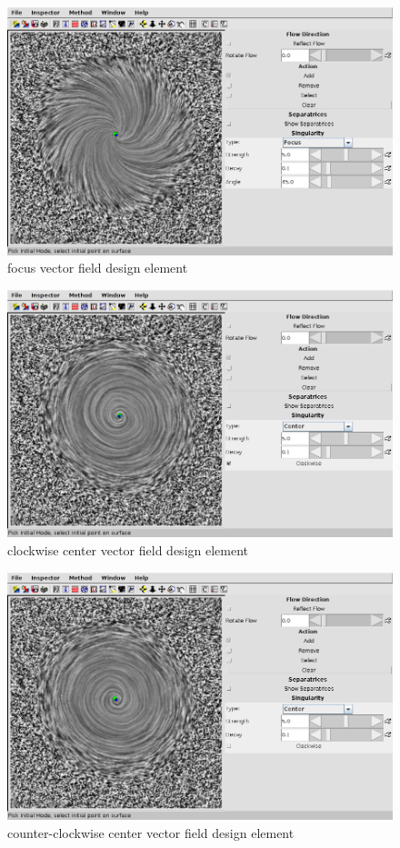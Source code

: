 \documentclass[a4paper,10pt,notitlepage]{scrartcl}
\begin{document}
\begin{figure}
  \centering
  \includegraphics[scale=0.5]{img-3-2/focus.png}
  \caption{focus vector field design element}
  \label{fig:focus}
\end{figure}

\begin{figure}
  \centering
  \includegraphics[scale=0.5]{img-3-2/center-cw.png}
  \caption{clockwise center vector field design element}
  \label{fig:center-cw}
\end{figure}

\begin{figure}
  \centering
  \includegraphics[scale=0.5]{img-3-2/center-cc.png}
  \caption{counter-clockwise center vector field design element}
  \label{fig:center-cc}
\end{figure}
\end{document}
